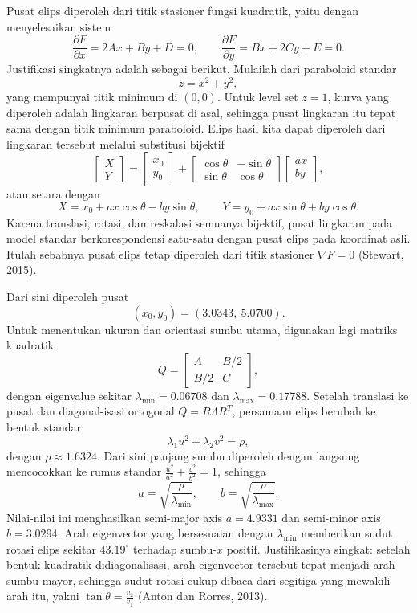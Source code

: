 \documentclass[12pt,a4paper]{article}
\begin{document}
Pusat elips diperoleh dari titik stasioner fungsi kuadratik, yaitu dengan menyelesaikan sistem
\[
\frac{\partial F}{\partial x}=2Ax+By+D=0,
\qquad
\frac{\partial F}{\partial y}=Bx+2Cy+E=0.
\]
Justifikasi singkatnya adalah sebagai berikut. Mulailah dari paraboloid standar
\[
z=x^2+y^2,
\]
yang mempunyai titik minimum di \((0,0)\). Untuk level set \(z=1\), kurva yang diperoleh adalah lingkaran berpusat di asal, sehingga pusat lingkaran itu tepat sama dengan titik minimum paraboloid. Elips hasil kita dapat diperoleh dari lingkaran tersebut melalui substitusi bijektif
\[
\begin{bmatrix}
X\\ Y
\end{bmatrix}
=
\begin{bmatrix}
x_0\\ y_0
\end{bmatrix}
+
\begin{bmatrix}
\cos\theta & -\sin\theta\\
\sin\theta & \cos\theta
\end{bmatrix}
\begin{bmatrix}
a x\\ b y
\end{bmatrix},
\]
atau setara dengan
\[
X=x_0+a x\cos\theta-b y\sin\theta,\qquad
Y=y_0+a x\sin\theta+b y\cos\theta.
\]
Karena translasi, rotasi, dan reskalasi semuanya bijektif, pusat lingkaran pada model standar berkorespondensi satu-satu dengan pusat elips pada koordinat asli. Itulah sebabnya pusat elips tetap diperoleh dari titik stasioner \(\nabla F=0\) (Stewart, 2015).

Dari sini diperoleh pusat
\[
(x_0,y_0)=(3.0343,\ 5.0700).
\]
Untuk menentukan ukuran dan orientasi sumbu utama, digunakan lagi matriks kuadratik
\[
Q=
\begin{bmatrix}
A & B/2\\
B/2 & C
\end{bmatrix},
\]
dengan eigenvalue sekitar \(\lambda_{\min}=0.06708\) dan \(\lambda_{\max}=0.17788\). Setelah translasi ke pusat dan diagonal-isasi ortogonal \(Q=R\Lambda R^T\), persamaan elips berubah ke bentuk standar
\[
\lambda_1 u^2 + \lambda_2 v^2 = \rho,
\]
dengan \(\rho \approx 1.6324\). Dari sini panjang sumbu diperoleh dengan langsung mencocokkan ke rumus standar \(\frac{u^2}{a^2}+\frac{v^2}{b^2}=1\), sehingga
\[
a=\sqrt{\frac{\rho}{\lambda_{\min}}}, \qquad b=\sqrt{\frac{\rho}{\lambda_{\max}}}.
\]
Nilai-nilai ini menghasilkan semi-major axis \(a=4.9331\) dan semi-minor axis \(b=3.0294\). Arah eigenvector yang bersesuaian dengan \(\lambda_{\min}\) memberikan sudut rotasi elips sekitar \(43.19^\circ\) terhadap sumbu-\(x\) positif. Justifikasinya singkat: setelah bentuk kuadratik didiagonalisasi, arah eigenvector tersebut tepat menjadi arah sumbu mayor, sehingga sudut rotasi cukup dibaca dari segitiga yang mewakili arah itu, yakni \(\tan\theta=\frac{v_2}{v_1}\) (Anton dan Rorres, 2013).
\end{document}
